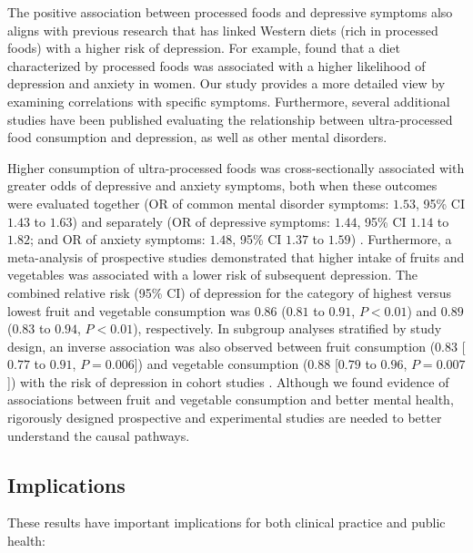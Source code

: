 \documentclass[jou]{apa7}
\begin{document}
The positive association between processed foods and depressive symptoms also aligns with previous research that has linked Western diets (rich in processed foods) with a higher risk of depression. For example, \parencite{laneUltraProcessedFoodConsumption2022} found that a diet characterized by processed foods was associated with a higher likelihood of depression and anxiety in women. Our study provides a more detailed view by examining correlations with specific symptoms. Furthermore, several additional studies have been published evaluating the relationship between ultra-processed food consumption and depression, as well as other mental disorders. 

Higher consumption of ultra-processed foods was cross-sectionally associated with greater odds of depressive and anxiety symptoms, both when these outcomes were evaluated together (OR of common mental disorder symptoms: $1.53$, 95\% CI $1.43$ to $1.63$) and separately (OR of depressive symptoms: $1.44$, 95\% CI $1.14$ to $1.82$; and OR of anxiety symptoms: $1.48$, 95\% CI $1.37$ to $1.59$) \parencite{laneUltraProcessedFoodConsumption2022}. Furthermore, a meta-analysis of prospective studies demonstrated that higher intake of fruits and vegetables was associated with a lower risk of subsequent depression. The combined relative risk (95\% CI) of depression for the category of highest versus lowest fruit and vegetable consumption was $0.86$ ($0.81$ to $0.91$, $P < 0.01$) and $0.89$ ($0.83$ to $0.94$, $P < 0.01$), respectively. In subgroup analyses stratified by study design, an inverse association was also observed between fruit consumption ($0.83$ [$0.77$ to $0.91$, $P = 0.006$]) and vegetable consumption ($0.88$ [$0.79$ to $0.96$, $P = 0.007$]) with the risk of depression in cohort studies \parencite{liuFruitVegetableConsumption2016}. Although we found evidence of associations between fruit and vegetable consumption and better mental health, rigorously designed prospective and experimental studies are needed to better understand the causal pathways.


\subsection{Implications}\label{implicaciones}

These results have important implications for both clinical practice and public health:
\end{document}
